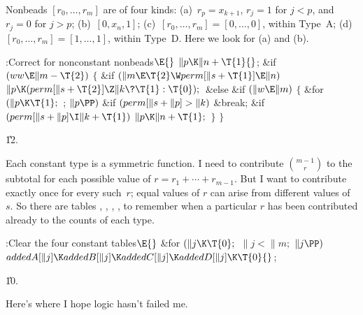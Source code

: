 Nonbeads $[r_0,\ldots,r_m]$ are of four kinds: (a)~$r_p=x_{k+1}$,
$r_j=1$ for $j<p$, and $r_j=0$ for $j>p$; (b)~$[0,x_n,1]$;
(c)~$[r_0,\ldots,r_m]=[0,\ldots,0]$, within Type~A;
(d)~$[r_0,\ldots,r_m]=[1,\ldots,1]$, within Type~D.
Here we look for (a) and (b).

\Y\B\4:Correct for nonconstant nonbeads\X${}\E{}$\6
$\|p\K\|n+\T{1}{}$;\6
\&{if} ${}(\\{ww}\E\|m-\T{2}){}$\5
${}\{{}$\1\6
\&{if} ${}(\|m\E\T{2}\W\\{perm}[\|s+\T{1}]\E\|n){}$\1\5
${}\|p\K(\\{perm}[\|s+\T{2}]\Z\|k\?\T{1}:\T{0});{}$\2\6
\&{else} \&{if} ${}(\|w\E\|m){}$\5
${}\{{}$\1\6
\&{for} ${}(\|p\K\T{1};{}$  ; ${}\|p\PP){}$\1\6
\&{if} ${}(\\{perm}[\|s+\|p]>\|k){}$\1\5
\&{break};\2\2\6
\&{if} ${}(\\{perm}[\|s+\|p]\I\|k+\T{1}){}$\1\5
${}\|p\K\|n+\T{1};{}$\2\6
\4${}\}{}$\2\6
\4${}\}{}$\2\par
\U12.\fi

Each constant type is a symmetric function. I need to contribute
$m-1\choose r$ to the subtotal for each possible value of
$r=r_1+\cdots+r_{m-1}$. But I want to contribute exactly once for
every such~$r$; equal values of $r$ can arise from different values of~$s$.
So there are tables , , , , to remember
when a particular $r$ has been contributed already to the counts of
each type.

\Y\B\4:Clear the four constant tables\X${}\E{}$\6
\&{for} ${}(\|j\K\T{0};{}$ ${}\|j<\|m;{}$ ${}\|j\PP){}$\1\5
${}\\{addedA}[\|j]\K\\{addedB}[\|j]\K\\{addedC}[\|j]\K\\{addedD}[\|j]\K%
\T{0}{}$;\2\par
\U10.\fi

Here's where I hope logic hasn't failed me.

